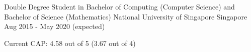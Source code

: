

\begin{cventries}

  \cventry
  {Double Degree Student in Bachelor of Computing (Computer Science) and Bachelor of Science (Mathematics)} %
  {National University of Singapore} %
  {Singapore} %
  {Aug 2015 - May 2020 (expected)} %
  {
    \begin{cvitems} %
    \item {Current CAP: 4.58 out of 5 (3.67 out of 4)}
    \end{cvitems}
  }

\end{cventries}
